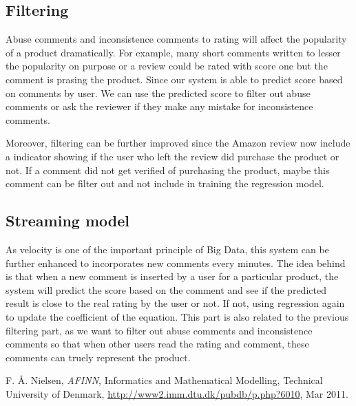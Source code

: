 \subsection{Filtering}
Abuse comments and inconsistence comments to rating will affect the popularity of a product dramatically. For example, many short comments written to lesser the popularity on purpose or a review could be rated with score one but the comment is prasing the product. Since our system is able to predict score based on comments by user. We can use the predicted score to filter out abuse comments or ask the reviewer if they make any mistake for inconsistence comments. 

Moreover, filtering can be further improved since the Amazon review now include a indicator showing if the user who left the review did purchase the product or not. If a comment did not get verified of purchasing the product, maybe this comment can be filter out and not include in training the regression model.

\subsection{Streaming model}
As velocity is one of the important principle of Big Data, this system can be further enhanced to incorporates new comments every minutes. The idea behind is that when a new comment is inserted by a user for a particular product, the system will predict the score based on the comment and see if the predicted result is close to the real rating by the user or not. If not, using regression again to update the coefficient of the equation. This part is also related to the previous filtering part, as we want to filter out abuse comments and inconsistence comments so that when other users read the rating and comment, these comments can truely represent the product.

\begin{thebibliography}{1}
	F. {\AA}. Nielsen, 
	{\em AFINN},
	Informatics and Mathematical Modelling, Technical University of Denmark,
	\url{http://www2.imm.dtu.dk/pubdb/p.php?6010},
	Mar 2011.
\end{thebibliography}

